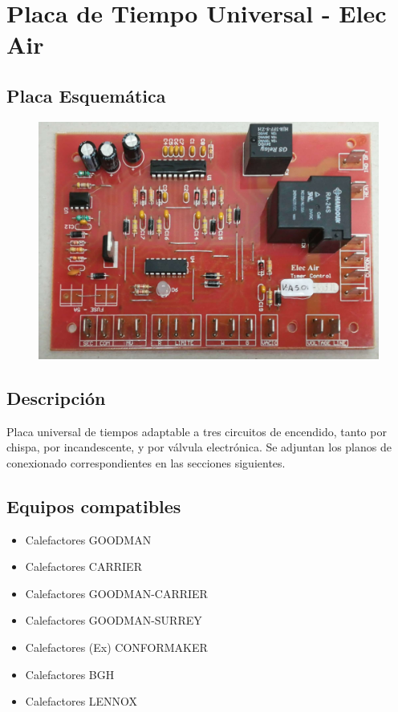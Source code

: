 \documentclass{article}
\begin{document}
\section*{Placa de Tiempo Universal - Elec Air}

\subsection*{Placa Esquemática}

\begin{figure}[H]
\centering
\includegraphics[width=0.8\linewidth]{images/placa.jpg}
\end{figure}

\subsection*{Descripción}

\large{Placa universal de tiempos adaptable a tres circuitos de encendido, tanto por chispa, por incandescente, y por válvula electrónica. Se adjuntan los planos de conexionado correspondientes en las secciones siguientes.}

\subsection*{Equipos compatibles}
\large{
\begin{itemize}
\item Calefactores GOODMAN
\item Calefactores CARRIER
\item Calefactores GOODMAN-CARRIER
\item Calefactores GOODMAN-SURREY
\item Calefactores (Ex) CONFORMAKER
\item Calefactores BGH
\item Calefactores LENNOX
\end{itemize}
}
\end{document}

